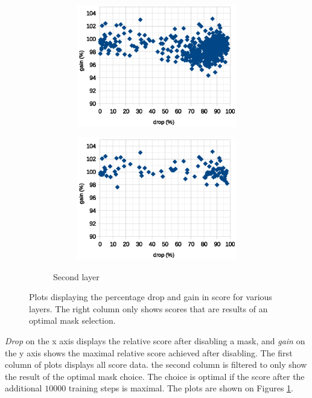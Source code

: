 \documentclass[12pt]{report}
\begin{document}
\begin{figure}[!ht]
\begin{subfigure}[b]{\linewidth}
\begin{subfigure}[b]{0.49\linewidth}
			\includegraphics[scale=0.7]{dia/all_second.eps}
		\end{subfigure}
		\begin{subfigure}[b]{0.49\linewidth}
			\centering
			\includegraphics[scale=0.7]{dia/best_second.eps}
		\end{subfigure}
		\caption{Second layer}
	\end{subfigure}
	\caption{Plots displaying the percentage drop and gain in score for various layers. The right column only shows scores that are results of an optimal mask selection.}\label{plots}
\end{figure}

\textit{Drop} on the x axis displays the relative score after disabling a mask, and \textit{gain} on the y axis shows the maximal relative score achieved after disabling. The first column of plots displays all score data. the second column is filtered to only show the result of the optimal mask choice. The choice is optimal if the score after the additional $10000$ training steps is maximal. The plots are shown on Figures \ref{plots}.
\end{document}
